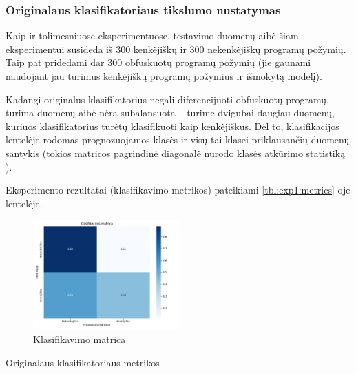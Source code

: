 \subsubsection{Originalaus klasifikatoriaus tikslumo nustatymas}\label{sec:exp:1}

Kaip ir tolimesniuose eksperimentuose, testavimo duomenų aibė šiam
eksperimentui susideda iš 300 kenkėjiškų ir 300 nekenkėjiškų programų požymių.
Taip pat pridedami dar 300 obfuskuotų programų požymių (jie gaunami naudojant
jau turimus kenkėjiškų programų požymius ir išmokytą \MALGAN modelį).

Kadangi originalus klasifikatorius negali diferencijuoti obfuskuotų programų,
turima duomenų aibė nėra subalansuota -- turime dvigubai daugiau duomenų,
kuriuos klasifikatorius turėtų klasifikuoti kaip kenkėjiškus. Dėl to,
klasifikacijos lentelėje  rodomas prognozuojamos klasės
ir visų tai klasei priklausančių duomenų santykis (tokios matricos pagrindinė
diagonalė nurodo klasės atkūrimo statistiką ).

Eksperimento rezultatai (klasifikavimo metrikos) pateikiami \ref{tbl:exp1:metrics}-oje lentelėje.
\begin{figure}[h]
    \centering
    \includegraphics[width=0.5\textwidth]{images/normal_2x2.png}
    \caption{Klasifikavimo matrica}
    \label{fig:exp1:confusion}
\end{figure}

\begin{table}[h]
    \caption{Originalaus klasifikatoriaus metrikos}
    \centering
    \label{tbl:exp1:metrics}
\end{table}